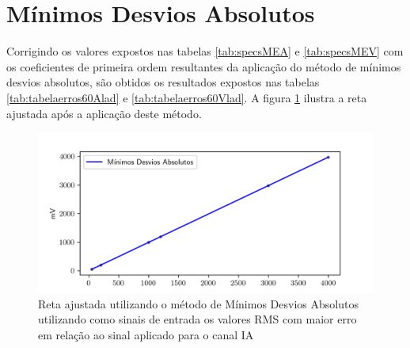 \begin{table}[htb]
\end{table}

\section{Mínimos Desvios Absolutos}

Corrigindo os valores expostos nas tabelas \ref{tab:specsMEA} e \ref{tab:specsMEV} com os coeficientes de primeira ordem resultantes da aplicação do método de mínimos desvios absolutos, são obtidos os resultados expostos nas tabelas \ref{tab:tabelaerros60Alad} e \ref{tab:tabelaerros60Vlad}. A figura \ref{fig:lad_line} ilustra a reta ajustada após a aplicação deste método.

\begin{figure}[htp]
    \centering
    \includegraphics[width=12cm]{pictures/mda_linha.png}
    \caption{Reta ajustada utilizando o método de Mínimos Desvios Absolutos utilizando como sinais de entrada os valores RMS com maior erro em relação ao sinal aplicado para o canal IA}
    \label{fig:lad_line}
\end{figure}

